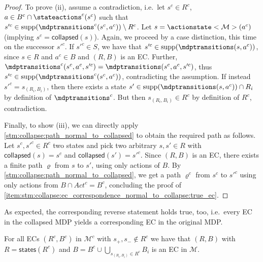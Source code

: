 \documentclass{theoretics}
\newcommand{\unionSym}{\cup}
\newcommand{\unionBin}{\mathbin{\unionSym}}
\newcommand{\intersectionSym}{\cap}
\newcommand{\intersectionBin}{\mathbin{\intersectionSym}}
\newcommand{\UnionSym}{\bigcup}
\newcommand{\union}{\unionBin}
\newcommand{\intersection}{\intersectionBin}
\newcommand{\Union}{\UnionSym}
\newcommand{\MDP}{\mathcal{M}}
\newcommand{\States}{S}
\newcommand{\Actions}{Act}
\newcommand{\finitepath}{\varrho}
\DeclareMathOperator{\support}{supp}
\newcommand{\targetstate}{s_+}
\newcommand{\sinkstate}{s_-}
\newcommand{\eccollapsed}{\mathsf{collapsed}}
\newcommand{\ecstates}{\mathsf{states}}
\begin{document}
\begin{proof}
	To prove (ii), assume a contradiction, i.e.\ let $s^c \in R^c$, $a \in B^c \intersection \stateactions^c(s^c)$ such that $s'^c \in \support(\mdptransitions^c(s^c, a^c)) \setminus R^c$.
	Let $s = \actionstate<\MDP>(a^c)$ (implying $s^c = \eccollapsed(s)$).
	Again, we proceed by a case distinction, this time on the successor $s'^c$.
	If $s'^c \in \States$, we have that $s'^c \in \support(\mdptransitions(s, a^c))$, since $s \in R$ and $a^c \in B$ and $(R, B)$ is an EC.
	Further, $\mdptransitions^c(s^c, a^c, s'^c) = \mdptransitions(s^c, a^c, s'^c)$, thus $s'^c \in \support(\mdptransitions^c(s^c, a^c))$, contradicting the assumption.
	If instead $s'^c = s_{(R_i, B_i)}$, then there exists a state $s' \in \support(\mdptransitions(s, a^c)) \intersection R_i$ by definition of $\mdptransitions^c$.
	But then $s_{(R_i, B_i)} \in R^c$ by definition of $R^c$, contradiction.

	Finally, to show (iii), we can directly apply \cref{stm:collapse:path_normal_to_collapsed} to obtain the required path as follows.
	Let $s^c, s'^c \in R^c$ two states and pick two arbitrary $s, s' \in R$ with $\eccollapsed(s) = s^c$ and $\eccollapsed(s') = s'^c$.
	Since $(R, B)$ is an EC, there exists a finite path $\finitepath$ from $s$ to $s'$, using only actions of $B$.
	By \cref{stm:collapse:path_normal_to_collapsed}, we get a path $\finitepath^c$ from $s^c$ to $s'^c$ using only actions from $B \intersection \Actions^c = B^c$, concluding the proof of \cref{item:stm:collapse:ec_correspondence_normal_to_collapse:true_ec}. 
\end{proof}
As expected, the corresponding reverse statement holds true, too, i.e.\ every EC in the collapsed MDP yields a corresponding EC in the original MDP.
\begin{lemma} \label{stm:collapse:ec_correspondence_collapse_to_normal}
	For all ECs $(R^c, B^c)$ in $\MDP^c$ with $\targetstate, \sinkstate \notin R^c$ we have that $(R, B)$ with $R = \ecstates(R^c)$ and $B = B^c \union \Union_{s_{(R_i, B_i)} \in R^c} B_i$ is an EC in $\MDP$.
\end{lemma}
\end{document}
